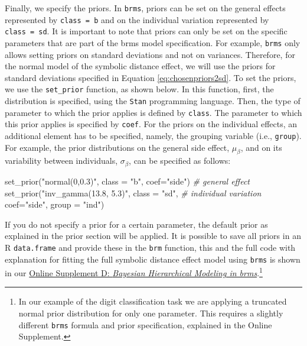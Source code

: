 \documentclass[
  english,
  doc,floatsintext]{apa6}
\newenvironment{Shaded}{\begin{snugshade}}{\end{snugshade}}
\newcommand{\AttributeTok}[1]{\textcolor[rgb]{0.77,0.63,0.00}{#1}}
\newcommand{\CommentTok}[1]{\textcolor[rgb]{0.56,0.35,0.01}{\textit{#1}}}
\newcommand{\FunctionTok}[1]{\textcolor[rgb]{0.00,0.00,0.00}{#1}}
\newcommand{\NormalTok}[1]{#1}
\newcommand{\StringTok}[1]{\textcolor[rgb]{0.31,0.60,0.02}{#1}}
\begin{document}
Finally, we specify the priors. In \texttt{brms}, priors can be set on the general effects represented by \texttt{class\ =\ b} and on the individual variation represented by \texttt{class\ =\ sd}. It is important to note that priors can only be set on the specific parameters that are part of the brms model specification. For example, \texttt{brms} only allows setting priors on standard deviations and not on variances.
Therefore, for the normal model of the symbolic distance effect, we will use the priors for standard deviations specified in Equation \eqref{eq:chosenpriors2sd}. To set the priors, we use the \texttt{set\_prior} function, as shown below. In this function, first, the distribution is specified, using the \texttt{Stan} programming language. Then, the type of parameter to which the prior applies is defined by \texttt{class}. The parameter to which this prior applies is specified by \texttt{coef}. For the priors on the individual effects, an additional element has to be specified, namely, the grouping variable (i.e., \texttt{group}). For example, the prior distributions on the general side effect, \(\mu_{\beta}\), and on its variability between individuals, \(\sigma_{\beta}\), can be specified as follows:
~

\scriptsize

\begin{Shaded}
\begin{Highlighting}[]
\FunctionTok{set\_prior}\NormalTok{(}\StringTok{"normal(0,0.3)"}\NormalTok{, }\AttributeTok{class =} \StringTok{"b"}\NormalTok{, }\AttributeTok{coef=}\StringTok{"side"}\NormalTok{)  }\CommentTok{\# general effect }
\FunctionTok{set\_prior}\NormalTok{(}\StringTok{"inv\_gamma(13.8, 5.3)"}\NormalTok{, }\AttributeTok{class =} \StringTok{"sd"}\NormalTok{,       }\CommentTok{\# individual variation }
          \AttributeTok{coef=}\StringTok{"side"}\NormalTok{, }\AttributeTok{group =} \StringTok{"ind"}\NormalTok{) }
\end{Highlighting}
\end{Shaded}

\normalsize

\scriptsize

\normalsize If you do not specify a prior for a certain parameter, the default prior as explained in the prior section will be applied. It is possible to save all priors in an R \texttt{data.frame} and provide these in the \texttt{brm} function, this and the full code with explanation for fitting the full symbolic distance effect model using \texttt{brms} is shown in our \href{https://github.com/MyrtheV/Bayesian-Hierarchical-Modelling-An-Introduction-and-Reassessment/blob/main/D\%20-\%20Tutorial\%20Normal\%20Model\%20brms/Online-Supplement-D---Bayesian-Hierarchical-Modeling-in-brms.pdf}{Online Supplement D: \emph{Bayesian Hierarchical Modeling in brms}}.\footnote{In our example of the digit classification task we are applying a truncated normal prior distribution for only one parameter. This requires a slightly different \texttt{brms} formula and prior specification, explained in the Online Supplement.}
\end{document}
